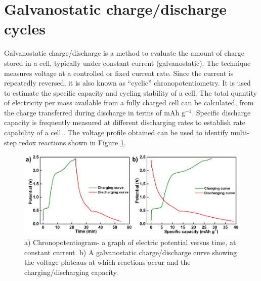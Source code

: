 \section{Galvanostatic charge/discharge cycles}
Galvanostatic charge/discharge is a method to evaluate the amount of charge stored in a cell, typically under constant current (galvanostatic). The technique measures voltage at a controlled or fixed current rate. Since the current is repeatedly reversed, it is also known as \enquote{cyclic} chronopotentiometry. It is used to estimate the specific capacity and cycling stability of a cell. The total quantity of electricity per mass available from a fully charged cell can be calculated, from the charge transferred during discharge in terms of mAh g$^{-1}$. Specific discharge capacity is frequently measured at different discharging rates to establish rate capability of a cell \cite{pyun_electrochemistry_2012-1}. The voltage profile obtained can be used to identify multi-step redox reactions shown in Figure \ref{Figures/chap2fig:ChrononCDC}. 

\begin{figure}[th!]
\centering
\includegraphics[width=\textwidth]{Figures/chap2fig/ChrononCDC.pdf}
\caption{a) Chronopotentiogram- a graph of electric potential versus time, at constant current. b) A galvanostatic charge/discharge curve showing the voltage plateaus at which reactions occur and the charging/discharging capacity.}
\label{Figures/chap2fig:ChrononCDC}
\end{figure}

